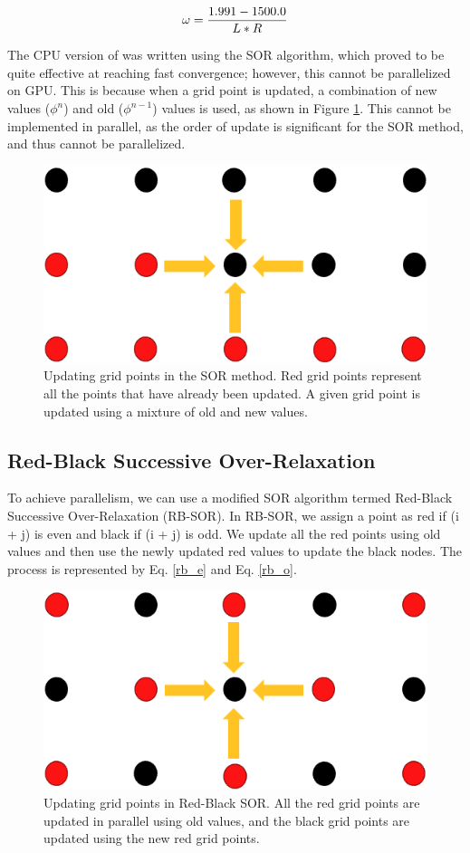 \begin{equation}{\label{omg}}
\omega = \frac{1.991 - 1500.0}{L*R}
\end{equation}

The CPU version of {\ehd} was written using the SOR algorithm, which proved to be quite effective at reaching fast convergence; however, this cannot be parallelized on GPU. This is because when a grid point is updated, a combination of new values ($\phi^{n}$) and old ($\phi^{n-1}$) values is used, as shown in Figure \ref{fig:sor_methods}. This cannot be implemented in parallel, as the order of update is significant for the SOR method, and thus cannot be parallelized.


\begin{figure}[!htb]
\centering
 \vspace{0.2cm}
\includegraphics[width=0.4\linewidth]{ch4/figs/SOR.png}
\vspace{0.3cm}
\caption{\label{fig:sor_methods} Updating grid points in the SOR method. Red grid points represent all the points that have already been updated. A given grid point is updated using a mixture of old and new values.}
\end{figure}

\subsection*{Red-Black Successive Over-Relaxation}
To achieve parallelism, we can use a modified SOR algorithm termed Red-Black Successive Over-Relaxation (RB-SOR). In RB-SOR, we assign a point as red if (i + j) is even and black if (i + j) is odd. We update all the red points using old values and then use the newly updated red values to update the black nodes. The process is represented by Eq. \ref{rb_e} and Eq. \ref{rb_o}.


\begin{figure}[!htb]
\centering
 \vspace{0.2cm}
 \includegraphics[width=0.4\linewidth]{ch4/figs/RB-SOR.png}
 \vspace{0.3cm}
\caption{\label{fig:rb_sor_methods} Updating grid points in Red-Black SOR. All the red grid points are updated in parallel using old values, and the black grid points are updated using the new red grid points.}
\end{figure}

